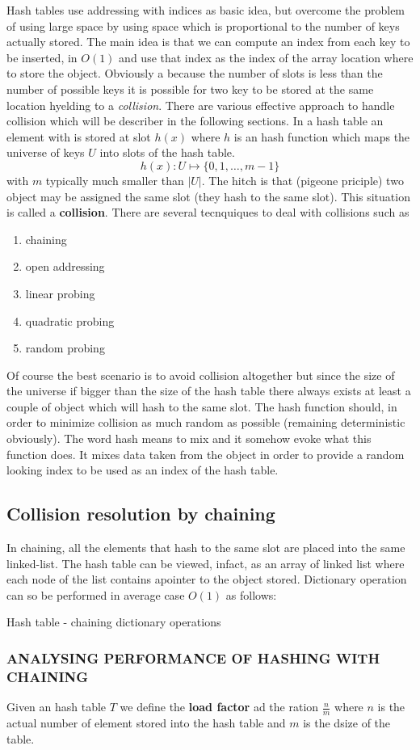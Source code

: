 Hash tables use addressing with indices as basic idea, but overcome the problem of using large space by using space which is proportional to the number of keys actually stored. The main idea is that we can compute an index from each key to be inserted, in $O(1)$ and use that index as the index of the array location where to store the object. Obviously a because the number of slots is less than the number of possible keys it is possible for two key to be stored at the same location hyelding to a \textit{collision}. There are various effective approach to handle collision which will be describer in the following sections.
In a hash table an element with is stored at slot $h(x)$ where $h$ is an hash function which maps the universe of keys $U$ into slots of the hash table.
\[
h(x): U \mapsto \{0,1,\ldots,m-1\}
\]
with $m$ typically much smaller than $|U|$. The hitch is that (pigeone priciple) two object may be assigned the same slot (they hash to the same slot). This situation is called a \textbf{collision}. There are several tecnquiques to deal with collisions such as 
\begin{enumerate}
\item chaining
\item open addressing
\item linear probing
\item quadratic probing
\item random probing
\end{enumerate}
Of course the best scenario is to avoid collision altogether but since the size of the universe if bigger than the size of the hash table there always exists at least a couple of object which will hash to the same slot. The hash function should, in order to minimize collision as much random as possible (remaining deterministic obviously). The word hash means to mix and it somehow evoke what this function does. It mixes data taken from the object in order to provide a random looking index to be used as an index of the hash table.

\subsection{Collision resolution by chaining}
In chaining, all the elements that hash to the same slot are placed into the same linked-list. The hash table can be viewed, infact, as an array of linked list where each node of the list contains apointer to the object stored.
Dictionary operation can so be performed in average case $O(1)$ as follows:
\begin{algorithm}
\caption{Hash table - chaining dictionary operations }
\end{algorithm}

\subsubsection{ANALYSING PERFORMANCE OF HASHING WITH CHAINING}
Given an hash table $T$ we define the \textbf{load factor} ad the ration $\frac{n}{m}$ where $n$ is the actual number of element stored into the hash table and $m$ is the dsize of the table.
